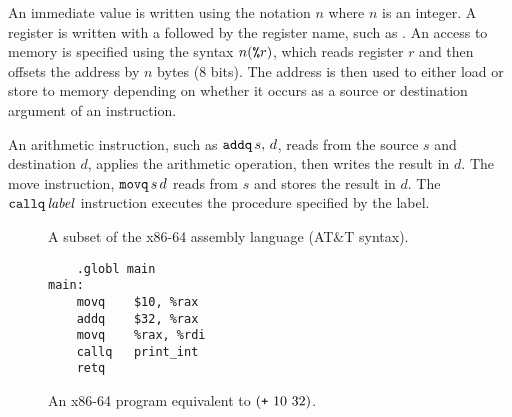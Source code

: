 \documentclass[11pt]{book}
\begin{document}
An immediate value is written using the notation \key{\$}$n$ where $n$
is an integer. 
%
A register is written with a \key{\%} followed by the register name,
such as .
%
An access to memory is specified using the syntax $n(\texttt{\%}r)$,
which reads register $r$ and then offsets the address by $n$ bytes
(8 bits). The address is then used to either load or store to memory
depending on whether it occurs as a source or destination argument of
an instruction.

An arithmetic instruction, such as $\texttt{addq}\,s,\,d$, reads from the
source $s$ and destination $d$, applies the arithmetic operation, then
writes the result in $d$.
%
The move instruction, $\texttt{movq}\,s\,d$ reads from $s$ and stores the
result in $d$. 
%
The $\texttt{callq}\,\mathit{label}$ instruction executes the procedure
specified by the label.

\begin{figure}[tbp]
\caption{A subset of the x86-64 assembly language (AT\&T syntax).}
\label{fig:x86-a}
\end{figure}


\begin{wrapfigure}{r}{2.25in}
\begin{lstlisting}
	.globl main
main:
	movq	$10, %rax
	addq	$32, %rax
	movq	%rax, %rdi
	callq	print_int
	retq
\end{lstlisting}
\caption{An x86-64 program equivalent to $(\texttt{+}~10~32)$.}
\label{fig:p0-x86}
\end{wrapfigure}
\end{document}
